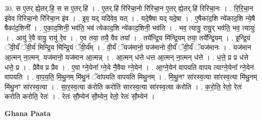 \documentclass[17pt]{extarticle}
\begin{document}
30. स ए॒तर् ह्ये॒तर्.हि॒ स स ए॒तर्.हि॑ । . ए॒तर्.हि॑ रिरिचा॒नो रि॑रिचा॒न ए॒तर् ह्ये॒तर्.हि॑ रिरिचा॒नः । . रि॒रि॒चा॒न इ॑वेव रिरिचा॒नो रि॑रिचा॒न इ॑व । . इ॒व॒ यद् यदि॑वेव॒ यत् । . यदे॒षैषा यद् यदे॒षा । . ए॒षैका॑द॒शि न्ये॑काद॒शि न्ये॒षै षैका॑द॒शिनी᳚ । . ए॒का॒द॒शिनी॒ भव॑ति॒ भव॑ त्येकाद॒शि न्ये॑काद॒शिनी॒ भव॑ति । . भव॒ त्यायु॒ रायु॒र् भव॑ति॒ भव॒ त्यायुः॑ । . आयु॑ रे॒वै वायु॒ रायु॑ रे॒व । . ए॒व तया॒ तयै॒ वैव तया᳚ । . तये᳚न्द्रि॒य मि॑न्द्रि॒यम् तया॒ तये᳚न्द्रि॒यम् । . इ॒न्द्रि॒यं ॅवी॒र्यं॑ ॅवी॒र्य॑ मिन्द्रि॒य मि॑न्द्रि॒यं ॅवी॒र्य᳚म् । . वी॒र्यं॑ ॅयज॑मानो॒ यज॑मानो वी॒र्यं॑ ॅवी॒र्यं॑ ॅयज॑मानः । . यज॑मान आ॒त्मन् ना॒त्मन्. यज॑मानो॒ यज॑मान आ॒त्मन्न् । . आ॒त्मन् ध॑त्ते धत्त आ॒त्मन् ना॒त्मन् ध॑त्ते । . ध॒त्ते॒ प्र प्र ध॑त्ते धत्ते॒ प्र । . प्रैवैव प्र प्रैव । . ए॒वा ग्ने॒येना᳚ ग्ने॒ये नै॒वैवा ग्ने॒येन॑ । . आ॒ग्ने॒येन॑ वापयति वापय त्याग्ने॒येना᳚ ग्ने॒येन॑ वापयति । . वा॒प॒य॒ति॒ मि॒थु॒नम् मि॑थु॒नं ॅवा॑पयति वापयति मिथु॒नम् । . मि॒थु॒नꣳ सा॑रस्व॒त्या सा॑रस्व॒त्या मि॑थु॒नम् मि॑थु॒नꣳ सा॑रस्व॒त्या । . सा॒र॒स्व॒त्या क॑रोति करोति सारस्व॒त्या सा॑रस्व॒त्या क॑रोति । . क॒रो॒ति॒ रेतो॒ रेतः॑ करोति करोति॒ रेतः॑ । . रेतः॑ सौ॒म्येन॑ सौ॒म्येन॒ रेतो॒ रेतः॑ सौ॒म्येन॑ । \newline

\textbf{Ghana Paata } \newline
\end{document}
